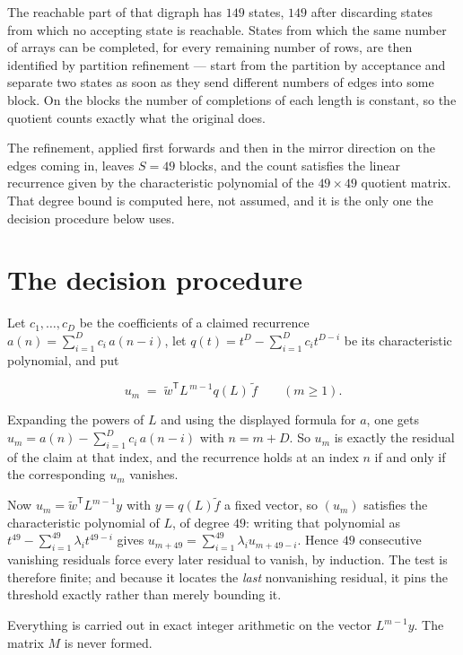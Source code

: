 \documentclass[11pt]{article}
\theoremstyle{definition}
\begin{document}
The reachable part of that digraph has $149$ states, $149$ after discarding states from which no accepting state is reachable. States from which the same number of arrays can be completed, for every remaining number of rows, are then identified by partition refinement --- start from the partition by acceptance and separate two states as soon as they send different numbers of edges into some block. On the blocks the number of completions of each length is constant, so the quotient counts exactly what the original does.

The refinement, applied first forwards and then in the mirror direction on the edges coming in, leaves $S = 49$ blocks, and the count satisfies the linear recurrence given by the characteristic polynomial of the $49 \times 49$ quotient matrix. That degree bound is computed here, not assumed, and it is the only one the decision procedure below uses.

\section{The decision procedure}

Let $c_1,\dots,c_D$ be the coefficients of a claimed recurrence $a(n) = \sum_{i=1}^{D} c_i\,a(n-i)$, let $q(t) = t^{D} - \sum_{i=1}^{D} c_i t^{D-i}$ be its characteristic polynomial, and put

\[u_m \;=\; \tilde w^{\mathsf T} L^{\,m-1} q(L)\,\tilde f \qquad (m \ge 1).\]

Expanding the powers of $L$ and using the displayed formula for $a$, one gets $u_m = a(n) - \sum_{i=1}^{D} c_i\,a(n-i)$ with $n = m + D$. So $u_m$ is exactly the residual of the claim at that index, and the recurrence holds at an index $n$ if and only if the corresponding $u_m$ vanishes.

Now $u_m = \tilde w^{\mathsf T} L^{m-1} y$ with $y = q(L)\tilde f$ a fixed vector, so $(u_m)$ satisfies the characteristic polynomial of $L$, of degree $49$: writing that polynomial as $t^{49} - \sum_{i=1}^{49} \lambda_i t^{49-i}$ gives $u_{m+49} = \sum_{i=1}^{49} \lambda_i u_{m+49-i}$. Hence $49$ consecutive vanishing residuals force every later residual to vanish, by induction. The test is therefore finite; and because it locates the {\itshape last} nonvanishing residual, it pins the threshold exactly rather than merely bounding it.

Everything is carried out in exact integer arithmetic on the vector $L^{m-1}y$. The matrix $M$ is never formed.
\end{document}
